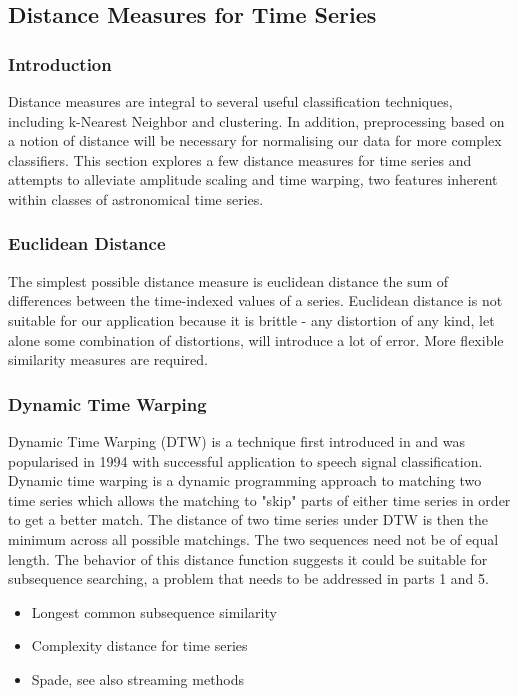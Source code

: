 \documentclass[11pt]{article}
\begin{document}
	\subsection{Distance Measures for Time Series}
	\subsubsection{Introduction}
	Distance measures are integral to several useful classification techniques, including k-Nearest Neighbor and clustering. In addition, preprocessing based on a notion of distance will be necessary for normalising our data for more complex classifiers. This section explores a few distance measures for time series and attempts to alleviate amplitude scaling and time warping, two features inherent within classes of astronomical time series.
	\subsubsection{Euclidean Distance}
	The simplest possible distance measure is euclidean distance the sum of differences between the time-indexed values of a series. Euclidean distance is not suitable for our application because it is brittle - any distortion of any kind, let alone some combination of distortions, will introduce a lot of error. More flexible similarity measures are required.
	\subsubsection{Dynamic Time Warping}
	Dynamic Time Warping (DTW) is a technique first introduced in \citep{sakoe1978dynamic} and was popularised in 1994 \citep{berndt1994using} with successful application to speech signal classification. Dynamic time warping is a dynamic programming approach to matching two time series which allows the matching to "skip" parts of either time series in order to get a better match. The distance of two time series under DTW is then the minimum across all possible matchings. The two sequences need not be of equal length. The behavior of this distance function suggests it could be suitable for subsequence searching, a problem that needs to be addressed in parts 1 and 5.
	\begin{itemize}
		\item Longest common subsequence similarity
		\item Complexity distance for time series \citep{batista2011complexity}
		\item Spade, see also streaming methods
	\end{itemize}
\end{document}

